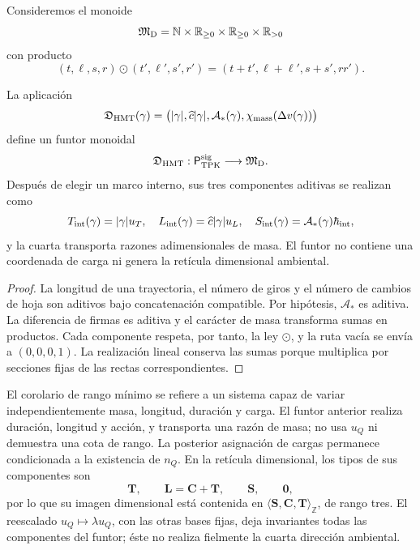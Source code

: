 Consideremos el monoide
\[
 \mathfrak M_{\rm D}
 =\mathbb N\times\mathbb R_{\ge0}\times
  \mathbb R_{\ge0}\times\mathbb R_{>0}
\]
con producto
\[
 (t,\ell,s,r)\odot(t',\ell',s',r')
 =(t+t',\ell+\ell',s+s',rr').
\]

\begin{theorem}
\label{thm:funtor-dimensional-minimo}
La aplicación
\[
 \mathfrak D_{\rm HMT}(\gamma)
 =\bigl(
 |\gamma|,
 \widehat c|\gamma|,
 \mathcal A_*(\gamma),
 \chi_{\rm mass}(\Delta v(\gamma))
 \bigr)
\]
define un funtor monoidal
\[
 \mathfrak D_{\rm HMT}:
 \mathsf P_{\rm TPK}^{\rm sig}\longrightarrow\mathfrak M_{\rm D}.
\]
Después de elegir un marco interno, sus tres componentes aditivas se realizan
como
\[
 T_{\rm int}(\gamma)=|\gamma|u_T,
 \quad
 L_{\rm int}(\gamma)=\widehat c|\gamma|u_L,
 \quad
 S_{\rm int}(\gamma)=\mathcal A_*(\gamma)\hbar_{\rm int},
\]
y la cuarta transporta razones adimensionales de masa. El funtor no contiene
una coordenada de carga ni genera la retícula dimensional ambiental.
\end{theorem}

\begin{proof}
La longitud de una trayectoria, el número de giros y el número de cambios de
hoja son aditivos bajo concatenación compatible. Por hipótesis,
\(\mathcal A_*\) es aditiva. La diferencia de firmas es aditiva y el carácter
de masa transforma sumas en productos. Cada componente respeta, por tanto,
la ley \(\odot\), y la ruta vacía se envía a
\((0,0,0,1)\). La realización lineal conserva las sumas porque multiplica
por secciones fijas de las rectas correspondientes.
\end{proof}

\begin{remark}
El corolario de rango mínimo se refiere a un sistema capaz de variar
independientemente masa, longitud, duración y carga. El funtor anterior
realiza duración, longitud y acción, y transporta una razón de masa; no usa
\(u_Q\) ni demuestra una cota de rango. La posterior asignación de cargas
permanece condicionada a la existencia de \(n_Q\). En la retícula dimensional,
los tipos de sus componentes son
\[
 \mathbf T,\qquad \mathbf L=\mathbf C+\mathbf T,\qquad
 \mathbf S,\qquad \mathbf0,
\]
por lo que su imagen dimensional está contenida en
\(\langle\mathbf S,\mathbf C,\mathbf T\rangle_{\mathbb Z}\), de rango tres.
El reescalado \(u_Q\mapsto\lambda u_Q\), con las otras bases fijas, deja
invariantes todas las componentes del funtor; éste no realiza fielmente la
cuarta dirección ambiental.
\end{remark}

